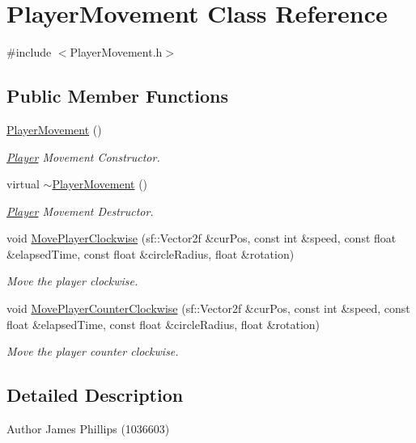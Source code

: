 \hypertarget{class_player_movement}{}\section{Player\+Movement Class Reference}
\label{class_player_movement}


{\ttfamily \#include $<$Player\+Movement.\+h$>$}

\subsection*{Public Member Functions}
\begin{DoxyCompactItemize}
\item 
\hyperlink{class_player_movement_a7b8465579dfaddd25d12b628a747253f}{Player\+Movement} ()
\begin{DoxyCompactList}\small\item\em \hyperlink{class_player}{Player} Movement Constructor. \end{DoxyCompactList}\item 
virtual \hyperlink{class_player_movement_aa685d50858cd780ca628e89b346645f9}{$\sim$\+Player\+Movement} ()
\begin{DoxyCompactList}\small\item\em \hyperlink{class_player}{Player} Movement Destructor. \end{DoxyCompactList}\item 
void \hyperlink{class_player_movement_a9975a1cdcd2243f3b142cd94230118bc}{Move\+Player\+Clockwise} (sf\+::\+Vector2f \&cur\+Pos, const int \&speed, const float \&elapsed\+Time, const float \&circle\+Radius, float \&rotation)
\begin{DoxyCompactList}\small\item\em Move the player clockwise. \end{DoxyCompactList}\item 
void \hyperlink{class_player_movement_abc231fdfdbc0f2acb2bcb38b54b1320f}{Move\+Player\+Counter\+Clockwise} (sf\+::\+Vector2f \&cur\+Pos, const int \&speed, const float \&elapsed\+Time, const float \&circle\+Radius, float \&rotation)
\begin{DoxyCompactList}\small\item\em Move the player counter clockwise. \end{DoxyCompactList}\end{DoxyCompactItemize}


\subsection{Detailed Description}
\begin{DoxyAuthor}{Author}
James Phillips (1036603) 
\end{DoxyAuthor}


